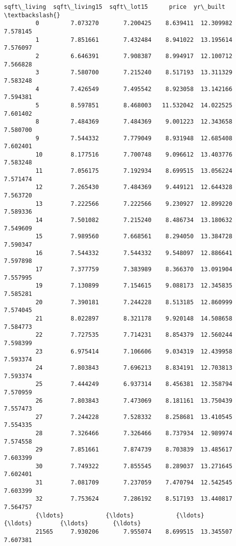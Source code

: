 \documentclass[11pt]{article}
\begin{document}
\begin{Verbatim}[commandchars=\\\{\}]
                sqft\_living  sqft\_living15  sqft\_lot15      price  yr\_built  \textbackslash{}
         0         7.073270       7.200425    8.639411  12.309982  7.578145   
         1         7.851661       7.432484    8.941022  13.195614  7.576097   
         2         6.646391       7.908387    8.994917  12.100712  7.566828   
         3         7.580700       7.215240    8.517193  13.311329  7.583248   
         4         7.426549       7.495542    8.923058  13.142166  7.594381   
         5         8.597851       8.468003   11.532042  14.022525  7.601402   
         8         7.484369       7.484369    9.001223  12.343658  7.580700   
         9         7.544332       7.779049    8.931948  12.685408  7.602401   
         10        8.177516       7.700748    9.096612  13.403776  7.583248   
         11        7.056175       7.192934    8.699515  13.056224  7.571474   
         12        7.265430       7.484369    9.449121  12.644328  7.563720   
         13        7.222566       7.222566    9.230927  12.899220  7.589336   
         14        7.501082       7.215240    8.486734  13.180632  7.549609   
         15        7.989560       7.668561    8.294050  13.384728  7.590347   
         16        7.544332       7.544332    9.548097  12.886641  7.597898   
         17        7.377759       7.383989    8.366370  13.091904  7.557995   
         19        7.130899       7.154615    9.088173  12.345835  7.585281   
         20        7.390181       7.244228    8.513185  12.860999  7.574045   
         21        8.022897       8.321178    9.920148  14.508658  7.584773   
         22        7.727535       7.714231    8.854379  12.560244  7.598399   
         23        6.975414       7.106606    9.034319  12.439958  7.593374   
         24        7.803843       7.696213    8.834191  12.703813  7.593374   
         25        7.444249       6.937314    8.456381  12.358794  7.570959   
         26        7.803843       7.473069    8.181161  13.750439  7.557473   
         27        7.244228       7.528332    8.258681  13.410545  7.554335   
         28        7.326466       7.326466    8.737934  12.989974  7.574558   
         29        7.851661       7.874739    8.703839  13.485617  7.603399   
         30        7.749322       7.855545    8.289037  13.271645  7.602401   
         31        7.081709       7.237059    7.470794  12.542545  7.603399   
         32        7.753624       7.286192    8.517193  13.440817  7.564757   
         {\ldots}            {\ldots}            {\ldots}         {\ldots}        {\ldots}       {\ldots}   
         21565     7.930206       7.955074    8.699515  13.345507  7.607381   

\end{Verbatim}
\end{document}
